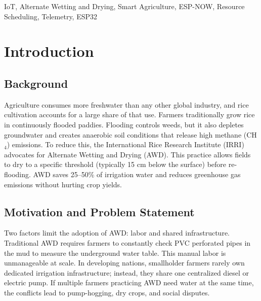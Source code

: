\documentclass[conference]{IEEEtran}
\begin{document}
\begin{IEEEkeywords}
IoT, Alternate Wetting and Drying, Smart Agriculture, ESP-NOW, Resource Scheduling, Telemetry, ESP32
\end{IEEEkeywords}

\section{Introduction}

\subsection{Background}
Agriculture consumes more freshwater than any other global industry, and rice cultivation accounts for a large share of that use. Farmers traditionally grow rice in continuously flooded paddies. Flooding controls weeds, but it also depletes groundwater and creates anaerobic soil conditions that release high methane (CH$_4$) emissions. To reduce this, the International Rice Research Institute (IRRI) advocates for Alternate Wetting and Drying (AWD). This practice allows fields to dry to a specific threshold (typically 15 cm below the surface) before re-flooding. AWD saves 25--50\% of irrigation water and reduces greenhouse gas emissions without hurting crop yields.

\subsection{Motivation and Problem Statement}
Two factors limit the adoption of AWD: labor and shared infrastructure. Traditional AWD requires farmers to constantly check PVC perforated pipes in the mud to measure the underground water table. This manual labor is unmanageable at scale. In developing nations, smallholder farmers rarely own dedicated irrigation infrastructure; instead, they share one centralized diesel or electric pump. If multiple farmers practicing AWD need water at the same time, the conflicts lead to pump-hogging, dry crops, and social disputes. 
\end{document}
